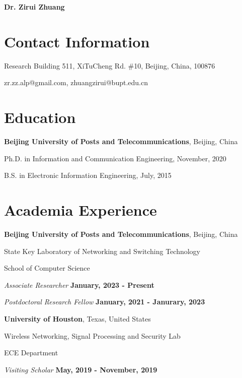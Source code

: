 \documentclass[letterpaper,11pt]{article}
\newcommand{\name}{Dr. Zirui Zhuang} %
\newcommand{\contentlength}{5.5in}
\begin{document}
	\selectfont
	
	\textbf{\name}
	\section{\textbf{Contact Information}}
	\begin{tcolorbox}[flush right,breakable,colback=white,colframe=white,width=\contentlength]
		\parbox{3in}{
			Research Building 511, XiTuCheng Rd. \#10, Beijing, China, 100876
		}
		\hfill
		\parbox{2in}{
			zr.zz.alp@gmail.com, zhuangzirui@bupt.edu.cn
		}
	\end{tcolorbox}
		
	
	
	\section{\textbf{Education}}
	\begin{tcolorbox}[flush right,breakable,colback=white,colframe=white,width=\contentlength]
		\textbf{Beijing University of Posts and Telecommunications}, Beijing, China
		
		\quad Ph.D. in Information and Communication Engineering, \null\hfill November, 2020
		
		\quad B.S. in Electronic Information Engineering, \null\hfill July, 2015
	\end{tcolorbox}
	
	
	
	
	\section{\textbf{Academia Experience}}
	\begin{tcolorbox}[flush right,breakable,colback=white,colframe=white,width=\contentlength]
		\textbf{Beijing University of Posts and Telecommunications}, Beijing, China
		
		\quad State Key Laboratory of Networking and Switching Technology
		
		\quad School of Computer Science
		
		\quad \quad \textit{Associate Researcher} \null\hfill \textbf{January, 2023 - Present}
		

		\quad \quad \textit{Postdoctoral Research Fellow} \null\hfill \textbf{January, 2021 - Janurary, 2023}
		
		\textbf{University of Houston}, Texas, United States
		
		\quad Wireless Networking, Signal Processing and Security Lab
		
		\quad ECE Department
		
		\quad \quad \textit{Visiting Scholar} \null\hfill \textbf{May, 2019 - November, 2019}
	\end{tcolorbox}
	
\end{document}
